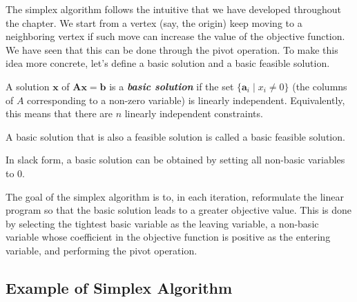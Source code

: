 The simplex algorithm follows the intuitive that we have developed throughout the chapter. We start from a vertex (say, the origin) keep moving to a neighboring vertex if such move can increase the value of the objective function. We have seen that this can be done through the pivot operation. To make this idea more concrete, let's define a basic solution and a basic feasible solution.

\begin{definition} 
    A solution $\mathbf{x}$ of $\mathbf{A}\mathbf{x} = \mathbf{b}$ is a \textit{\textbf{basic solution}} if the set $\{ \mathbf{a}_i \mid x_i \neq 0 \}$ (the columns of $A$ corresponding to a non-zero variable) is linearly independent. Equivalently, this means that there are $n$ linearly independent constraints.
\end{definition}

\begin{definition} 
    A basic solution that is also a feasible solution is called a basic feasible solution.
\end{definition}

In slack form, a basic solution can be obtained by setting all non-basic variables to 0.

The goal of the simplex algorithm is to, in each iteration, reformulate the linear program so that the basic solution leads to a greater objective value. This is done by selecting the tightest basic variable as the leaving variable, a non-basic variable whose coefficient in the objective function is positive as the entering variable, and performing the pivot operation.

\subsection{Example of Simplex Algorithm}

